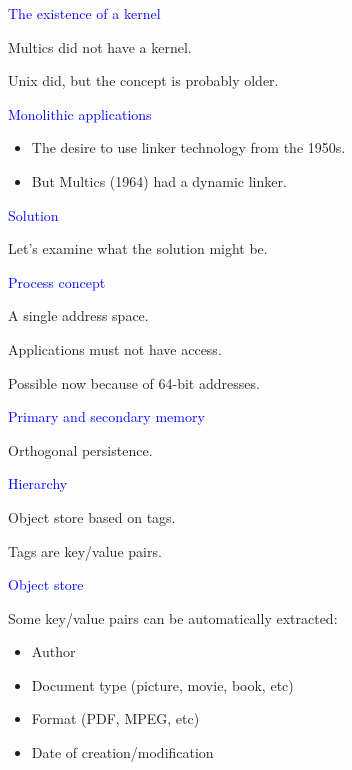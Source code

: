 \documentclass{slides}
\newcommand{\ti}[1]{\begin{center}\Large{\textcolor{blue}{#1}}\end{center}}
\begin{document}
\begin{slide}\ti{The existence of a kernel}

Multics did not have a kernel.

Unix did, but the concept is probably older.

\vfill\end{slide}
\begin{slide}\ti{Monolithic applications}

  \begin{itemize}
  \item The desire to use linker technology from the 1950s.
  \item But Multics (1964) had a dynamic linker.
  \end{itemize}

\vfill\end{slide}
\begin{slide}\ti{Solution}

Let's examine what the solution might be.

\vfill\end{slide}
\begin{slide}\ti{Process concept}

A single address space.

Applications must not have access.

Possible now because of 64-bit addresses.

\vfill\end{slide}
\begin{slide}\ti{Primary and secondary memory}

Orthogonal persistence.

\vfill\end{slide}
\begin{slide}\ti{Hierarchy}

Object store based on tags.

Tags are key/value pairs.

\vfill\end{slide}
\begin{slide}\ti{Object store}

Some key/value pairs can be automatically extracted:

\begin{itemize}
\item Author
\item Document type (picture, movie, book, etc)
\item Format (PDF, MPEG, etc)
\item Date of creation/modification
\end{itemize}

\vfill\end{slide}
\end{document}
